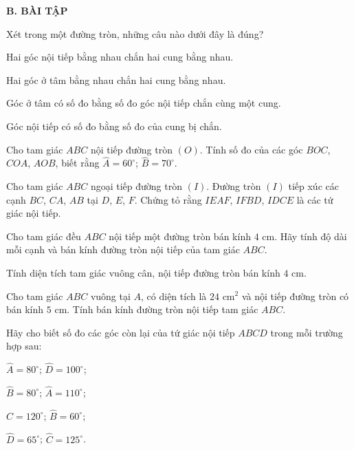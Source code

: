 \begin{practice}
    \textbf{B. BÀI TẬP}

    \begin{questions}[resume=SBT]
        \item Xét trong một đường tròn, những câu nào dưới đây là đúng?
        \begin{questions}
            \item Hai góc nội tiếp bằng nhau chắn hai cung bằng nhau.
            \item Hai góc ở tâm bằng nhau chắn hai cung bằng nhau.
            \item Góc ở tâm có số đo bằng số đo góc nội tiếp chắn cùng một cung.
            \item Góc nội tiếp có số đo bằng số đo của cung bị chắn.
        \end{questions}
        \answerline

        \item Cho tam giác $ABC$ nội tiếp đường tròn $(O)$. Tính số đo của các góc $BOC$, $COA$, $AOB$, biết rằng $\widehat{A}=60^\circ$; $\widehat{B}=70^\circ$.
        \answerline
        \answerline

        \item Cho tam giác $ABC$ ngoại tiếp đường tròn $(I)$. Đường tròn $(I)$ tiếp xúc các cạnh $BC$, $CA$, $AB$ tại $D$, $E$, $F$. Chứng tỏ rằng $IEAF$, $IFBD$, $IDCE$ là các tứ giác nội tiếp.
        \answerline
        \answerline
        \answerline

        \item Cho tam giác đều $ABC$ nội tiếp một đường tròn bán kính $4$ cm. Hãy tính độ dài mỗi cạnh và bán kính đường tròn nội tiếp của tam giác $ABC$.
        \answerline
        \answerline
        \answerline

        \item Tính diện tích tam giác vuông cân, nội tiếp đường tròn bán kính $4$ cm.
        \answerline
        \answerline

        \item Cho tam giác $ABC$ vuông tại $A$, có diện tích là $24$ cm$^2$ và nội tiếp đường tròn có bán kính $5$ cm. Tính bán kính đường tròn nội tiếp tam giác $ABC$.
        \answerline
        \answerline
        \answerline

        \item Hãy cho biết số đo các góc còn lại của tứ giác nội tiếp $ABCD$ trong mỗi trường hợp sau:
        \begin{questions}
            \item $\widehat{A}=80^\circ$; $\widehat{D}=100^\circ$;
            \item $\widehat{B}=80^\circ$; $\widehat{A}=110^\circ$;
            \item $\widehat{C}=120^\circ$; $\widehat{B}=60^\circ$;
            \item $\widehat{D}=65^\circ$; $\widehat{C}=125^\circ$.
        \end{questions}
        \answerline
        \answerline


\end{questions}
\end{practice}
